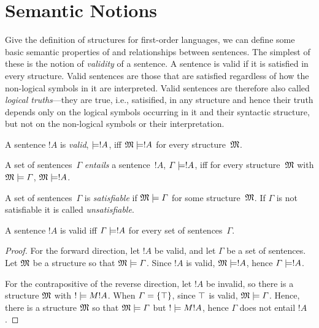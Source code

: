 \documentclass[syntax-and-semantics]{subfiles}
\begin{document}
\section{Semantic Notions}

\begin{wordy}
Give the definition of structures for first-order languages, we can
define some basic semantic properties of and relationships between
sentences.  The simplest of these is the notion of \emph{validity} of
a sentence.  A sentence is valid if it is satisfied in every
structure.  Valid sentences are those that are satisfied regardless of
how the non-logical symbols in it are interpreted.  Valid sentences
are therefore also called \emph{logical truths}---they are true, i.e.,
satisified, in any structure and hence their truth depends only on the
logical symbols occurring in it and their syntactic structure, but not
on the non-logical symbols or their interpretation.  
\end{wordy}

\begin{defn}[Validity]
A sentence $!A$ is \emph{valid}, $\Entails !A$, iff $\Sat{M}{!A}$ for every
structure~$\mathfrak M$.
\end{defn}

\begin{defn}[Entailment]
A set of sentences~$\Gamma$ \emph{entails} a sentence~$!A$, $\Gamma
\Entails !A$, iff for every structure~$\mathfrak M$ with
$\Sat{M}{\Gamma}$, $\Sat{M}{!A}$.
\end{defn}

\begin{defn}[Satisfiability]
A set of sentences~$\Gamma$ is \emph{satisfiable} if $\Sat{M}{\Gamma}$
for some structure~$\mathfrak M$.  If $\Gamma$ is not satisfiable it is
called \emph{unsatisfiable}.
\end{defn}

\begin{prop}
A sentence $!A$ is valid iff $\Gamma \Entails !A$ for every set of
sentences~$\Gamma$.
\end{prop}

\begin{proof}
For the forward direction, let $!A$ be valid, and let $\Gamma$ be a set of sentences. Let $\mathfrak M$ be a structure so that $\Sat{M}{\Gamma}$. Since $!A$ is valid, $\Sat{M}{!A}$, hence $\Gamma \Entails !A$.

For the contrapositive of the reverse direction, let $!A$ be invalid, so there is a structure $\mathfrak M$ with $\Sat!{M}{!A}$. When $\Gamma = \{ \top \}$, since $\top$ is valid, $\Sat{M}{\Gamma}$. Hence, there is a structure $\mathfrak M$ so that $\Sat{M}{\Gamma}$ but $\Sat!{M}{!A}$, hence $\Gamma$ does not entail $!A$.
\end{proof}
\end{document}
